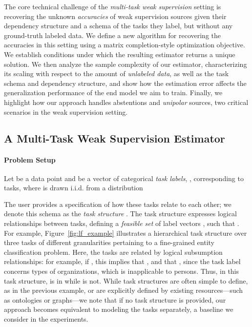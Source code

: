 \documentclass[letterpaper]{article}
\begin{document}
The core technical challenge of the \textit{multi-task weak supervision} setting is recovering the unknown \textit{accuracies} of weak supervision sources given their dependency structure and a schema of the tasks they label, but without any ground-truth labeled data.
We define a new algorithm for recovering the accuracies in this setting using a matrix completion-style optimization objective.
We establish conditions under which the resulting estimator returns a unique solution.
We then analyze the sample complexity of our estimator, characterizing its scaling with respect to the amount of \textit{unlabeled data}, as well as the task schema and dependency structure, and show how the estimation error affects the generalization performance of the end model we aim to train.
Finally, we highlight how our approach handles abstentions and \textit{unipolar} sources, two critical scenarios in the weak supervision setting.

\subsection{A Multi-Task Weak Supervision Estimator}

\paragraph*{Problem Setup}
Let  be a data point and  be a vector of categorical \textit{task labels}, , corresponding to  tasks, where  is drawn i.i.d. from a distribution 

The user provides a specification of how these tasks relate to each other; we denote this schema as the \textit{task structure} .
The task structure expresses logical relationships between tasks, defining a \textit{feasible set} of label vectors , such that .
For example, Figure~\ref{fig:lf_example} illustrates a hierarchical task structure over three tasks of different granularities pertaining to a fine-grained entity classification problem.
Here, the tasks are related by logical subsumption relationships: for example, if , this implies that , and that , since the task label  concerns types of organizations, which is inapplicable to persons.
Thus, in this task structure,  is in  while  is not.
While task structures are often simple to define, as in the previous example, or are explicitly defined by existing resources---such as ontologies or graphs---we note that if no task structure is provided, our approach becomes equivalent to modeling the  tasks separately, a baseline we consider in the experiments.
\end{document}
